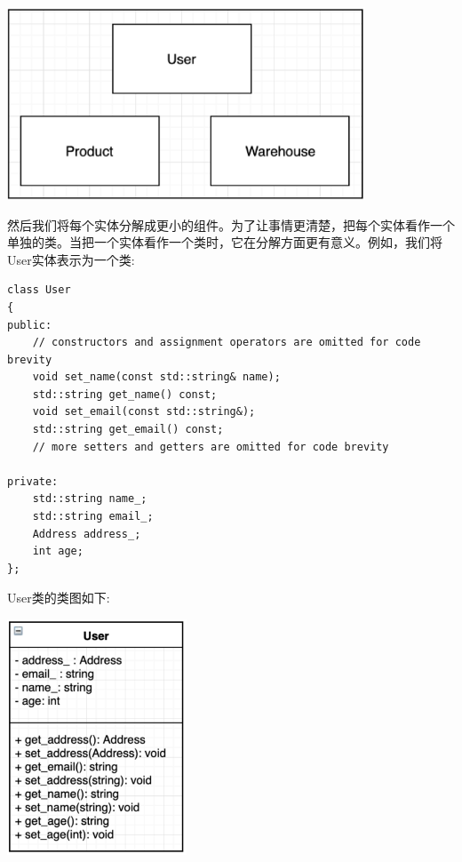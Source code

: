 \begin{center}
	\includegraphics[width=0.8\textwidth]{content/Section-2/Chapter-10/4}
\end{center}

然后我们将每个实体分解成更小的组件。为了让事情更清楚，把每个实体看作一个单独的类。当把一个实体看作一个类时，它在分解方面更有意义。例如，我们将User实体表示为一个类: \par

\begin{lstlisting}[caption={}]
class User
{
public:
	// constructors and assignment operators are omitted for code brevity
	void set_name(const std::string& name);
	std::string get_name() const;
	void set_email(const std::string&);
	std::string get_email() const;
	// more setters and getters are omitted for code brevity
	
private:
	std::string name_;
	std::string email_;
	Address address_;
	int age;
};
\end{lstlisting}

User类的类图如下: \par

\begin{center}
	\includegraphics[width=0.4\textwidth]{content/Section-2/Chapter-10/5}
\end{center}

